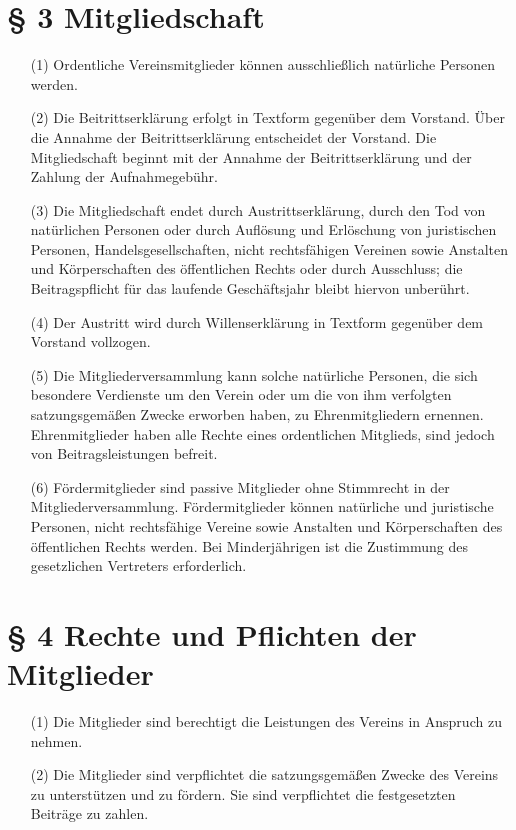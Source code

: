\documentclass[12pt,paper=a4,ngerman]{scrreprt}
\begin{document}
\section{\S{} 3 Mitgliedschaft}

\begin{itemize}
\item[(1)]
Ordentliche Vereinsmitglieder können ausschließlich natürliche
Personen werden.
\item[(2)]
Die Beitrittserklärung erfolgt in Textform gegenüber dem Vorstand.
Über die Annahme der Beitrittserklärung entscheidet der Vorstand. Die
Mitgliedschaft beginnt mit der Annahme der Beitrittserklärung und der
Zahlung der Aufnahmegebühr.
\item[(3)]
Die Mitgliedschaft endet durch Austrittserklärung, durch den Tod von
natürlichen Personen oder durch Auflösung und Erlöschung von
juristischen Personen, Handelsgesellschaften, nicht rechtsfähigen
Vereinen sowie Anstalten und Körperschaften des öffentlichen Rechts
oder durch Ausschluss; die Beitragspflicht für das laufende
Geschäftsjahr bleibt hiervon unberührt.
\item[(4)]
Der Austritt wird durch Willenserklärung in Textform gegenüber dem
Vorstand vollzogen.
\item[(5)]
Die Mitgliederversammlung kann solche natürliche Personen, die sich
besondere Verdienste um den Verein oder um die von ihm verfolgten
satzungsgemäßen Zwecke erworben haben, zu Ehrenmitgliedern ernennen.
Ehrenmitglieder haben alle Rechte eines ordentlichen Mitglieds, sind
jedoch von Beitragsleistungen befreit.
\item[(6)]
Fördermitglieder sind passive Mitglieder ohne Stimmrecht in der
Mitgliederversammlung. Fördermitglieder können natürliche und
juristische Personen, nicht rechtsfähige Vereine sowie Anstalten und
Körperschaften des öffentlichen Rechts werden. Bei Minderjährigen ist
die Zustimmung des gesetzlichen Vertreters erforderlich.
\end{itemize}

\section{\S{} 4 Rechte und Pflichten der Mitglieder}

\begin{itemize}
\item[(1)]
Die Mitglieder sind berechtigt die Leistungen des Vereins in Anspruch
zu nehmen.
\item[(2)]
Die Mitglieder sind verpflichtet die satzungsgemäßen Zwecke des
Vereins zu unterstützen und zu fördern. Sie sind verpflichtet die
festgesetzten Beiträge zu zahlen.
\end{itemize}
\end{document}

